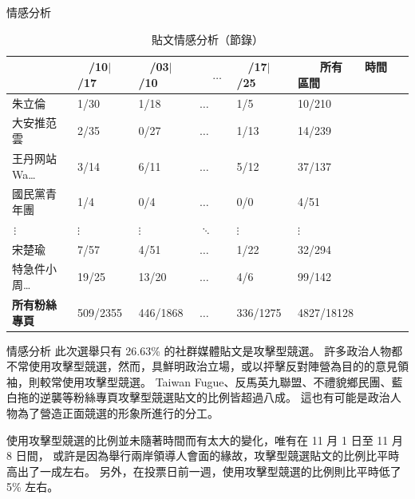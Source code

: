\documentclass{beamer}
\begin{document}
\begin{CJK}{UTF8}{bkai}
\begin{frame}{情感分析}
\begin{table}
\caption{貼文情感分析（節錄）}
\begin{tabular}{@{}L{7.2em}R{4em}R{4em}R{1em}R{4em}R{5em}@{}}
  \toprule
  　\newline　 & %
  　/10\newline\hspace*{1.35em}$\vert$/17 & %
  　/03\newline\hspace*{1.35em}$\vert$/10 & %
  　\newline\,$\ldots$\newline　 & %
  　/17\newline\hspace*{1.35em}$\vert$/25 & %
  　{\bfseries 　所有　　時間　　區間} \\
  \midrule
  朱立倫 & 1/30 & 1/18 & $\ldots$ & 1/5 & 10/210 \\
  大安推范雲 & 2/35 & 0/27 & $\ldots$ & 1/13 & 14/239 \\
  王丹网站 Wa\dots & 3/14 & 6/11 & $\ldots$ & 5/12 & 37/137 \\
  國民黨青年團 & 1/4 & 0/4 & $\ldots$ & 0/0 & 4/51 \\
  $\,\vdots$ & $\vdots$ & $\vdots$ & $\ddots$ & $\vdots$ & $\vdots$ \\
  宋楚瑜 & 7/57 & 4/51 & $\ldots$ & 1/22 & 32/294 \\
  特急件小周\dots & 19/25 & 13/20 & $\ldots$ & 4/6 & 99/142 \\
  {\bfseries 所有粉絲專頁} & 509/2355 & 446/1868 & $\ldots$ & 336/1275 & 4827/18128 \\
  \bottomrule
\end{tabular}
\end{table}
\end{frame}

\begin{frame}{情感分析}
\justifying
\qquad 此次選舉只有 26.63\% 的社群媒體貼文是攻擊型競選。%
許多政治人物都不常使用攻擊型競選，然而，具鮮明政治立場，或以抨擊反對陣營為目的的意見領袖，則較常使用攻擊型競選。%
Taiwan Fugue、反馬英九聯盟、不禮貌鄉民團、藍白拖的逆襲等粉絲專頁攻擊型競選貼文的比例皆超過八成。%
這也有可能是政治人物為了營造正面競選的形象所進行的分工。\par
\qquad 使用攻擊型競選的比例並未隨著時間而有太大的變化，唯有在 11 月 1 日至 11 月 8 日間，%
或許是因為舉行兩岸領導人會面的緣故，攻擊型競選貼文的比例比平時高出了一成左右。%
另外，在投票日前一週，使用攻擊型競選的比例則比平時低了 5\% 左右。%
\end{frame}


\end{CJK}
\end{document}
